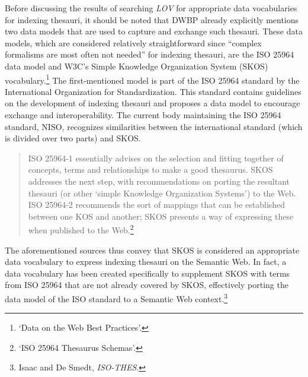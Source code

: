 Before discussing the results of searching \textit{LOV} for appropriate data vocabularies for indexing thesauri, it should be noted that DWBP already explicitly mentions two data models that are used to capture and exchange such thesauri. These data models, which are considered relatively straightforward since ``complex formalisms are most often not needed'' for indexing thesauri, are the ISO 25964 data model and W3C's Simple Knowledge Organization System (SKOS) vocabulary.\footnote{`Data on the Web Best Practices'.} The first-mentioned model is part of the ISO 25964 standard by the International Organization for Standardization. This standard contains guidelines on the development of indexing thesauri and proposes a data model to encourage exchange and interoperability. The current body maintaining the ISO 25964 standard, NISO, recognizes similarities between the international standard (which is divided over two parts) and SKOS.
\begin{quotation}
\noindent
ISO 25964-1 essentially advises on the selection and fitting together of concepts, terms and relationships to make a good thesaurus. SKOS addresses the next step, with recommendations on porting the resultant thesauri (or other `simple Knowledge Organization Systems') to the Web. ISO 25964-2 recommends the sort of mappings that can be established between one KOS and another; SKOS presents a way of expressing these when published to the Web.\footnote{`ISO 25964 Thesaurus Schemas'.} %
\end{quotation}
The aforementioned sources thus convey that SKOS is considered an appropriate data vocabulary to express indexing thesauri on the Semantic Web. In fact, a data vocabulary has been created specifically to supplement SKOS with terms from ISO 25964 that are not already covered by SKOS, %
effectively porting the data model of the ISO standard to a Semantic Web context.\footnote{Isaac and De Smedt, \textit{ISO-THES}.} %

